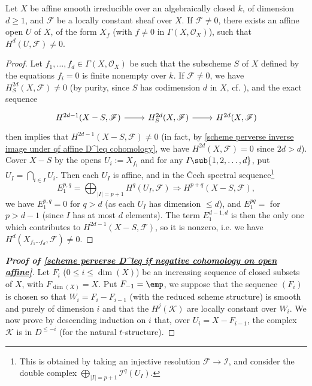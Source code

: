\begin{lemma}\label{scheme affine smooth over ac field cohomology over affine nonzero}
Let $X$ be affine smooth irreducible over an algebraically closed $k$, of dimension $d\geq 1$, and $\mathscr{F}$ be a locally constant sheaf over $X$. If $\mathscr{F}\neq 0$, there exists an affine open $U$ of $X$, of the form $X_f$ (with $f\neq 0$ in $\Gamma(X,\mathscr{O}_X)$), such that $H^d(U,\mathscr{F})\neq 0$.
\end{lemma}
\begin{proof}
Let $f_1,\dots,f_d\in\Gamma(X,\mathscr{O}_X)$ be such that the subscheme $S$ of $X$ defined by the equations $f_i=0$ is finite nonempty over $k$. If $\mathscr{F}\neq 0$, we have $H_S^{2d}(X,\mathscr{F})\neq 0$ (by purity, since $S$ has codimension $d$ in $X$, cf. \cite[XVI 3.7]{SGA4-3}), and the exact sequence
\[\begin{tikzcd}
H^{2d-1}(X-S,\mathscr{F})\ar[r]&H_S^{2d}(X,\mathscr{F})\ar[r]&H^{2d}(X,\mathscr{F})
\end{tikzcd}\]
then implies that $H^{2d-1}(X-S,\mathscr{F})\neq 0$ (in fact, by \cref{scheme perverse inverse image under qf affine D^leq cohomology}, we have $H^{2d}(X,\mathscr{F})=0$ since $2d>d$). Cover $X-S$ by the opens $U_i:=X_{f_i}$ and for any $I\sub\{1,2,\dots,d\}$, put $U_I=\bigcap_{i\in I}U_i$. Then each $U_I$ is affine, and in the \v{C}ech spectral sequence\footnote{This is obtained by taking an injective resolution $\mathscr{F}\to\mathscr{I}$, and consider the double complex $\bigoplus_{|I|=p+1}\mathscr{I}^q(U_I)$.}
\[E_1^{p,q}=\bigoplus_{|I|=p+1}H^q(U_I,\mathscr{F})\Rightarrow H^{p+q}(X-S,\mathscr{F}),\]
we have $E_1^{p,q}=0$ for $q>d$ (as each $U_I$ has dimension $\leq d$), and $E_1^{pq}=$ for $p>d-1$ (since $I$ has at most $d$ elements). The term $E_1^{d-1,d}$ is then the only one which contributes to $H^{2d-1}(X-S,\mathscr{F})$, so it is nonzero, i.e. we have $H^d(X_{f_1\cdots f_d},\mathscr{F})\neq 0$.
\end{proof}

\begin{proof}[\textbf{Proof of \cref{scheme perverse D^leq if negative cohomology on open affine}}]
Let $F_i$ ($0\leq i\leq\dim(X)$) be an increasing sequence of closed subsets of $X$, with $F_{\dim(X)}=X$. Put $F_{-1}=\emp$, we suppose that the sequence $(F_i)$ is chosen so that $W_i=F_i-F_{i-1}$ (with the reduced scheme structure) is smooth and purely of dimension $i$ and that the $H^j(\mathscr{K})$ are locally constant over $W_i$. We now prove by descending induction on $i$ that, over $U_i=X-F_{i-1}$, the complex $\mathscr{K}$ is in $D^{\leq -i}$ (for the natural $t$-structure).\par

\end{proof}

